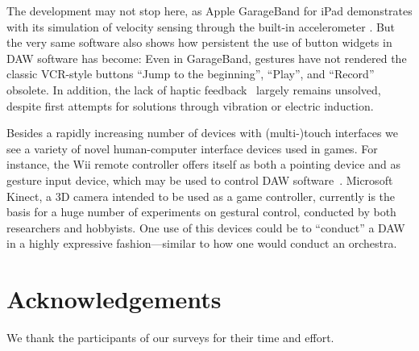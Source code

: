 \documentclass{aes130}
\begin{document}
The development may not stop here, as Apple GarageBand for iPad demonstrates with its simulation of velocity sensing through the built-in accelerometer \cite{garage}. But the very same software also shows how persistent the use of button widgets in DAW software has become: Even in GarageBand, gestures have not rendered the classic VCR-style buttons ``Jump to the beginning'', ``Play'', and ``Record'' obsolete. In addition, the lack of haptic feedback~\cite{Buxton:1985:ITT:325165.325239} largely remains unsolved, despite first attempts for solutions through vibration or electric induction.

Besides a rapidly increasing number of devices with (multi-)touch interfaces we see a variety of novel human-computer interface devices used in games. For instance, the Wii remote controller offers itself as both a pointing device and as gesture input device, which may be used to control DAW software~\cite{wii}. Microsoft Kinect, a 3D camera intended to be used as a game controller, currently is the basis for a huge number of experiments on gestural control, conducted by both researchers and hobbyists. One use of this devices could be to ``conduct'' a DAW in a highly expressive fashion---similar to how one would conduct an orchestra.

\section{Acknowledgements} \label{sec:Acknowledgements}

We thank the participants of our surveys for their time and effort.



\end{document}

